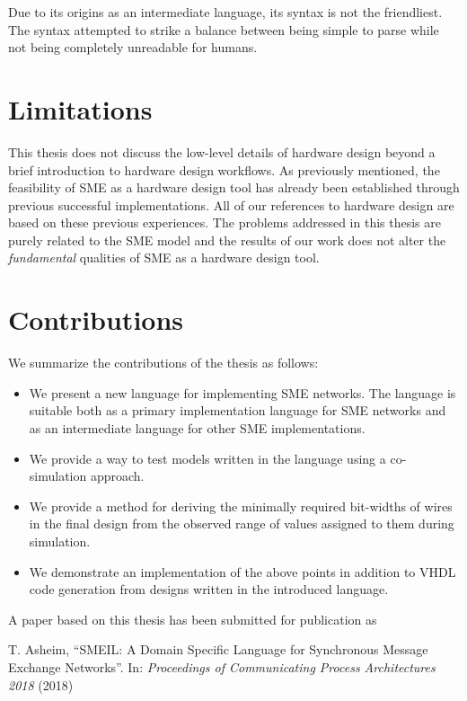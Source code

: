 Due to its origins as an intermediate language, its syntax is not the
friendliest. The syntax attempted to strike a balance between being simple to
parse while not being completely unreadable for humans.

\section{Limitations}
This thesis does not discuss the low-level details of hardware design beyond a
brief introduction to hardware design workflows. As previously mentioned, the
feasibility of SME as a hardware design tool has already been established
through previous successful implementations. All of our references to hardware
design are based on these previous experiences. The problems addressed in this
thesis are purely related to the SME model and the results of our work does not
alter the {\itshape fundamental} qualities of SME as a hardware design tool.


\section{Contributions}
We summarize the contributions of the thesis as follows:

\begin{itemize}
\item We present a new language for implementing SME networks. The language is
  suitable both as a primary implementation language for SME networks and as an
  intermediate language for other SME implementations.
\item We provide a way to test models written in the language using a
  co-simulation approach.
\item We provide a method for deriving the minimally required bit-widths of
  wires in the final design from the observed range of values assigned to them
  during simulation.
\item We demonstrate an implementation of the above points in addition to VHDL
  code generation from designs written in the introduced language.
\end{itemize}

\noindent A paper based on this thesis has been submitted for publication as

\begin{center}
\begin{minipage}{0.8\textwidth}
  T. Asheim, “SMEIL: A Domain Specific Language for Synchronous Message Exchange
  Networks”. In: {\itshape Proceedings of Communicating Process Architectures
    2018} (2018)
\end{minipage}
\end{center}

